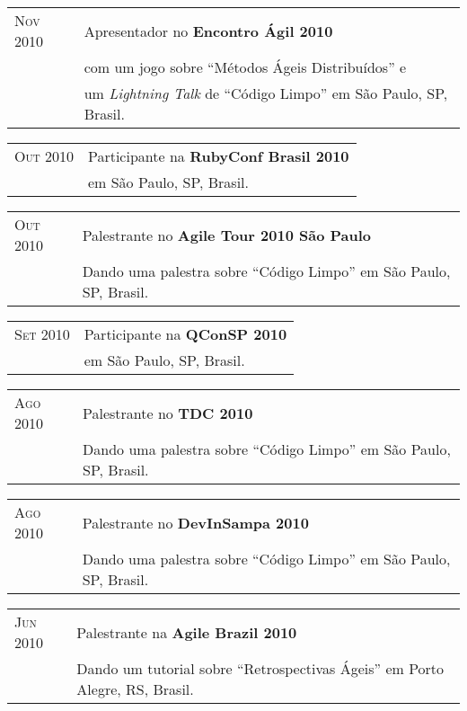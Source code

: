 \documentclass[letter,10pt]{article}
\begin{document}
\begin{tabular}{p{2.5cm}l}
  \textsc{Nov 2010} & Apresentador no \textbf{Encontro Ágil 2010}\\
  &com um jogo sobre ``Métodos Ágeis Distribuídos'' e\\
  & um \emph{Lightning Talk} de ``Código Limpo'' em São Paulo, SP, Brasil.\\
\end{tabular}

\begin{tabular}{p{2.5cm}l}
  \textsc{Out 2010} & Participante na \textbf{RubyConf Brasil 2010}\\
  & em São Paulo, SP, Brasil.\\
\end{tabular}

\begin{tabular}{p{2.5cm}l}
  \textsc{Out 2010} & Palestrante no \textbf{Agile Tour 2010 São Paulo}\\
  &Dando uma palestra sobre ``Código Limpo'' em São Paulo, SP, Brasil.\\
\end{tabular}

\begin{tabular}{p{2.5cm}l}
  \textsc{Set 2010} & Participante na \textbf{QConSP 2010}\\
  & em São Paulo, SP, Brasil.\\
\end{tabular}

\begin{tabular}{p{2.5cm}l}
  \textsc{Ago 2010} & Palestrante no \textbf{TDC 2010}\\
  &Dando uma palestra sobre ``Código Limpo'' em São Paulo, SP, Brasil.\\
\end{tabular}

\begin{tabular}{p{2.5cm}l}
  \textsc{Ago 2010} & Palestrante no \textbf{DevInSampa 2010}\\
  &Dando uma palestra sobre ``Código Limpo'' em São Paulo, SP, Brasil.\\
\end{tabular}

\begin{tabular}{p{2.5cm}l}
  \textsc{Jun 2010} & Palestrante na \textbf{Agile Brazil 2010}\\
  &Dando um tutorial sobre ``Retrospectivas Ágeis'' em Porto Alegre, RS, Brasil.\\
\end{tabular}
\end{document}
